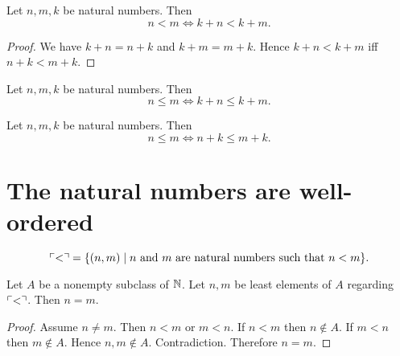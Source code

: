 \documentclass[../arithmetic.tex]{subfiles}
\begin{document}
  \begin{forthel}
    \begin{corollary}
      Let $n, m, k$ be natural numbers.
      Then \[ n \less m \iff k \plus n \less k \plus m. \]
    \end{corollary}
    \begin{proof}
      We have $k \plus n = n \plus k$ and $k \plus m = m \plus k$.
      Hence $k \plus n \less k \plus m$ iff $n \plus k \less m \plus k$.
    \end{proof}
  \end{forthel}

  \begin{forthel}
    \begin{corollary}
      Let $n, m, k$ be natural numbers.
      Then \[ n \leq m \iff k \plus n \leq k \plus m. \]
    \end{corollary}
  \end{forthel}

  \begin{forthel}
    \begin{corollary}
      Let $n, m, k$ be natural numbers.
      Then \[ n \leq m \iff n \plus k \leq m \plus k. \]
    \end{corollary}
  \end{forthel}


  \section{The natural numbers are well-ordered}

  \begin{forthel}
    \begin{definition}
      \[ \ulcorner<\urcorner = \{ (n, m) \mid \text{$n$ and $m$ are natural numbers such that
      $n < m$} \}. \]
    \end{definition}
  \end{forthel}

  \begin{forthel}
    \begin{proposition}
      Let $A$ be a nonempty subclass of $\mathbb{N}$.
      Let $n, m$ be least elements of $A$ regarding $\ulcorner<\urcorner$.
      Then $n = m$.
    \end{proposition}
    \begin{proof}
      Assume $n \neq m$.
      Then $n \less m$ or $m \less n$.
      If $n \less m$ then $n \notin A$.
      If $m \less n$ then $m \notin A$.
      Hence $n, m \notin A$.
      Contradiction.
      Therefore $n = m$.
    \end{proof}
  \end{forthel}
\end{document}
